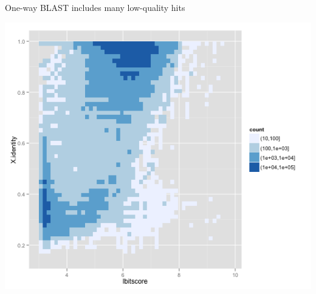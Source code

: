 \begin{frame}
\begin{alertblock}{One-way BLAST includes many low-quality hits}
\begin{center}
      \includegraphics[height=0.33\textheight]{images/rbbh3}
    \end{center}
  \end{alertblock}
\end{frame}


